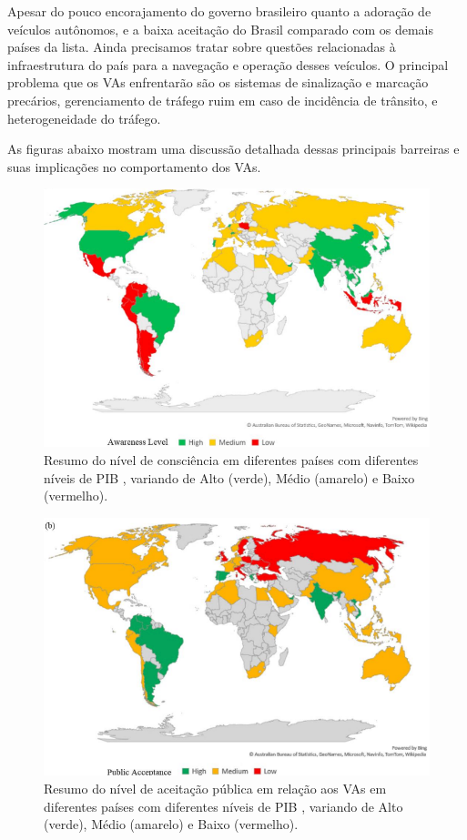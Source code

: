 Apesar do pouco encorajamento do governo brasileiro quanto a adoração de veículos autônomos, e a baixa aceitação do Brasil comparado com os demais países da lista. Ainda precisamos tratar sobre questões relacionadas à infraestrutura do país para a navegação e operação desses veículos. 
O principal problema que os VAs enfrentarão são os sistemas de sinalização e marcação precários, gerenciamento de tráfego ruim em caso de incidência de trânsito, e heterogeneidade do tráfego.

As figuras abaixo mostram uma discussão detalhada dessas principais barreiras e suas implicações no comportamento dos VAs.
\begin{figure}[H]
\centering
\includegraphics[width=12cm]{Figures/grafik-a.png}
\caption{ Resumo do nível de consciência em diferentes países com diferentes níveis de PIB \cite{mundobrasil}, variando de Alto (verde), Médio (amarelo) e Baixo (vermelho).}
\label{awareness}
\end{figure}
\begin{figure}[H]
\centering
\includegraphics[width=12cm]{Figures/grafik-b.png}
\caption{ Resumo do nível de aceitação pública em relação aos VAs em diferentes países com diferentes níveis de PIB \cite{mundobrasil}, variando de Alto (verde), Médio (amarelo) e Baixo (vermelho).}
\label{public}
\end{figure}

